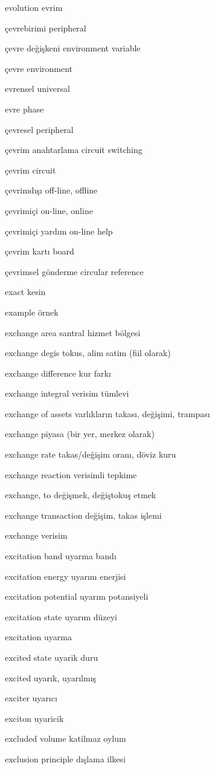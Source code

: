\documentclass[12pt,fleqn]{article}\usepackage{../../common}
\begin{document}
evolution evrim

çevrebirimi peripheral

çevre değişkeni environment variable

çevre environment

evrensel universal

evre phase

çevresel peripheral

çevrim anahtarlama circuit switching

çevrim circuit

çevrimdışı off-line, offline

çevrimiçi on-line, online

çevrimiçi yardım on-line help

çevrim kartı board

çevrimsel gönderme circular reference

exact kesin

example örnek

exchange area santral hizmet bölgesi

exchange degis tokus, alim satim (fiil olarak)

exchange difference kur farkı

exchange integral verisim tümlevi

exchange of assets varlıkların takası, değişimi, trampası

exchange piyasa (bir yer, merkez olarak)

exchange rate takas/değişim oranı, döviz kuru

exchange reaction verisimli tepkime

exchange, to değişmek, değiştokuş etmek

exchange transaction değişim, takas işlemi

exchange verisim

excitation band uyarma bandı

excitation energy uyarım enerjisi

excitation potential uyarım potansiyeli

excitation state uyarım düzeyi

excitation uyarma

excited state uyarik duru

excited uyarık, uyarılmış

exciter uyarıcı

exciton uyaricik

excluded volume katilmaz oylum

exclusion principle dışlama ilkesi
\end{document}
